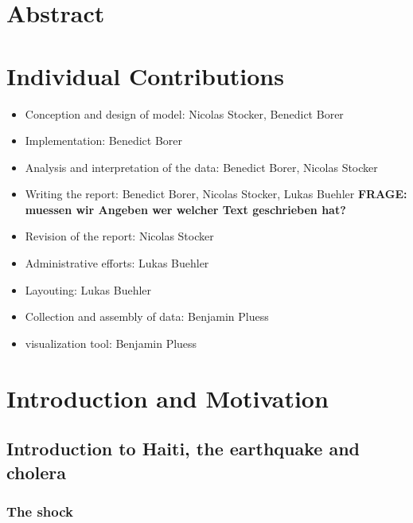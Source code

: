 \documentclass[11pt]{article}
\begin{document}
\section{Abstract}

\section{Individual Contributions}

\begin{itemize}
\item Conception and design of model: Nicolas Stocker, Benedict Borer
\item Implementation: Benedict Borer
\item Analysis and interpretation of the data: Benedict Borer, Nicolas Stocker
\item Writing the report: Benedict Borer, Nicolas Stocker, Lukas Buehler \textbf{FRAGE: muessen wir Angeben wer welcher Text geschrieben hat?}
\item Revision of the report: Nicolas Stocker
\item Administrative efforts: Lukas Buehler
\item Layouting: Lukas Buehler
\item Collection and assembly of data: Benjamin Pluess
\item visualization tool: Benjamin Pluess

\end{itemize}













\section{Introduction and Motivation}
\subsection{Introduction to Haiti, the earthquake and cholera }
\subsubsection*{The shock}
\end{document}
